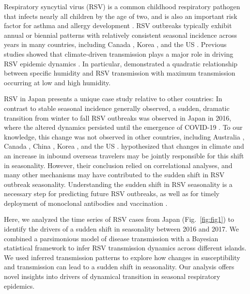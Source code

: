 \documentclass[12pt]{article}
\newcommand{\fref}[1]{Fig.~\ref{fig:#1}}
\begin{document}
Respiratory syncytial virus (RSV) is a common childhood respiratory pathogen that infects nearly all children by the age of two, and is also an important risk factor for asthma and allergy development \citep{sigurs1995asthma,sigurs2010asthma,edwards2012microbiology}.
RSV outbreaks typically exhibit annual or biennial patterns with relatively consistent seasonal incidence across years in many countries, including Canada \citep{paramo2023respiratory}, Korea \citep{kim2020investigation}, and the US \citep{pitzer2015environmental,baker2019epidemic}.
Previous studies showed that climate-driven transmission plays a major role in driving RSV epidemic dynamics \citep{pitzer2015environmental,baker2019epidemic}.
In particular, \cite{baker2019epidemic} demonstrated a quadratic relationship between specific humidity and RSV transmission with maximum transmission occurring at low and high humidity.

RSV in Japan presents a unique case study relative to other countries: In contrast to stable seasonal incidence generally observed, a sudden, dramatic transition from winter to fall RSV outbreaks was observed in Japan in 2016, where the altered dynamics persisted until the emergence of COVID-19 \citep{miyama2021seasonal,wagatsuma2021shifts}.
To our knowledge, this change was not observed in other countries, including Australia \citep{nazareno2022modelled}, Canada \citep{canada-report}, China \citep{luo2022comparison,li2023defining,li2024characterising}, Korea \citep{kim2023molecular}, and the US \citep{rose2018respiratory,hansen2022mortality}.
\cite{wagatsuma2021shifts} hypothesized that changes in climate and an increase in inbound overseas travelers may be jointly responsible for this shift in seasonality.
However, their conclusion relied on correlational analyses, and many other mechanisms may have contributed to the sudden shift in RSV outbreak seasonality.
Understanding the sudden shift in RSV seasonality is a necessary step for predicting future RSV outbreaks, as well as for timely deployment of monoclonal antibodies and vaccination \citep{mazur2023respiratory}.

Here, we analyzed the time series of RSV cases from Japan (\fref{fig1}) to identify the drivers of a sudden shift in seasonality between 2016 and 2017. 
We combined a parsimonious model of disease transmission with a Bayesian statistical framework to infer RSV transmission dynamics across different islands.
We used inferred transmission patterns to explore how changes in susceptibility and transmission can lead to a sudden shift in seasonality.
Our analysis offers novel insights into drivers of dynamical transition in seasonal respiratory epidemics.
\end{document}
